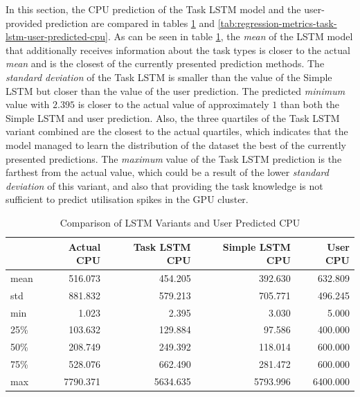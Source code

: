       In this section, the CPU prediction of the Task LSTM model and the user-provided prediction are compared in tables \ref{tab:comparison-task-lstm-user-predicted-cpu} and \ref{tab:regression-metrics-task-lstm-user-predicted-cpu}.
      As can be seen in table \ref{tab:comparison-task-lstm-user-predicted-cpu}, the \emph{mean} of the LSTM model that additionally receives information about the task types is closer to the actual \emph{mean} and is the closest of the currently presented prediction methods. The \emph{standard deviation} of the Task LSTM is smaller than the value of the Simple LSTM but closer than the value of the user prediction. The predicted \emph{minimum} value with $2.395$ is closer to the actual value of approximately $1$ than both the Simple LSTM and user prediction.
      Also, the three quartiles of the Task LSTM variant combined are the closest to the actual quartiles, which indicates that the model managed to learn the distribution of the dataset the best of the currently presented predictions.
      The \emph{maximum} value of the Task LSTM prediction is the farthest from the actual value, which could be a result of the lower \emph{standard deviation} of this variant, and also that providing the task knowledge is not sufficient to predict utilisation spikes in the GPU cluster.
      \begin{table}
        \centering
        \caption{Comparison of LSTM Variants and User Predicted CPU}
        \label{tab:comparison-task-lstm-user-predicted-cpu}
        \begin{tabular}{|l|rrrr|}
          \toprule
          {} &  Actual CPU &  Task LSTM CPU &  Simple LSTM CPU &  User CPU \\
          \midrule
          mean &     516.073 &        454.205 &          392.630 &      632.809 \\
          std  &     881.832 &        579.213 &          705.771 &      496.245 \\
          min  &       1.023 &          2.395 &            3.030 &        5.000 \\
          25\%  &     103.632 &        129.884 &           97.586 &      400.000 \\
          50\%  &     208.749 &        249.392 &          118.014 &      600.000 \\
          75\%  &     528.076 &        662.490 &          281.472 &      600.000 \\
          max  &    7790.371 &       5634.635 &         5793.996 &     6400.000 \\
          \bottomrule
          \end{tabular}
      \end{table}


